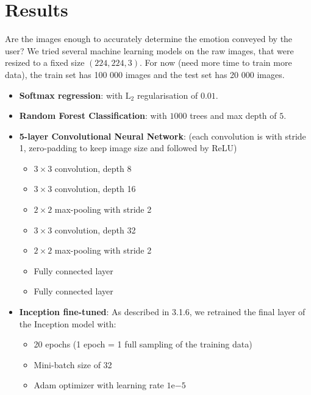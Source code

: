 \section{Results}
Are the images enough to accurately determine the emotion conveyed by the user? We tried several machine learning models on the raw images, that were resized to a fixed size $(224, 224, 3)$. For now (need more time to train more data), the train set has 100 000 images and the test set has 20 000 images.
\begin{itemize}
    \item \textbf{Softmax regression}: with $\text{L}_2$ regularisation of $0.01$.
    \item \textbf{Random Forest Classification}: with $1000$ trees and max depth of $5$.
    \item \textbf{5-layer Convolutional Neural Network}: (each convolution is with stride 1, zero-padding to keep image size and followed by ReLU)
    \begin{itemize}[topsep=0pt]
        \itemsep-1em
        \item $3\times 3$ convolution, depth 8
        \item $3\times 3$ convolution, depth 16
        \item $2\times 2$ max-pooling with stride 2
        \item $3\times 3$ convolution, depth 32
        \item $2 \times 2$ max-pooling with stride 2
        \item Fully connected layer
        \item Fully connected layer
    \end{itemize}
    \item \textbf{Inception fine-tuned}: As described in 3.1.6, we retrained the final layer of the Inception model with:
    \begin{itemize}[topsep=0pt]
        \itemsep-1em
        \item 20 epochs (1 epoch = 1 full sampling of the training data)
        \item Mini-batch size of 32
        \item Adam optimizer with learning rate $1\mathrm{e}{-5}$
    \end{itemize}
\end{itemize}

